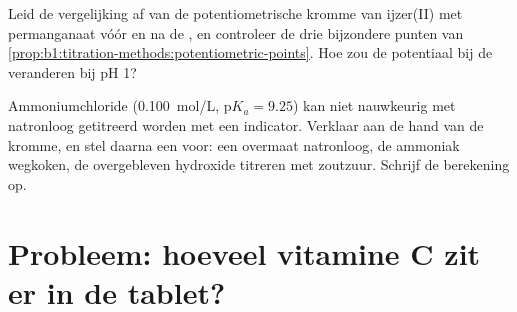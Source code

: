 \begin{exercise}[$\star\star\star$]\label{exo:b1:titration-methods:11}
Leid de vergelijking af van de potentiometrische kromme van ijzer(II)
met permanganaat vóór en na de , en controleer de drie
bijzondere punten van
\cref{prop:b1:titration-methods:potentiometric-points}. Hoe zou de
potentiaal bij de  veranderen bij pH 1?
\end{exercise}

\begin{exercise}[$\star\star\star$]\label{exo:b1:titration-methods:12}
Ammoniumchloride (\qty{0.100}{mol/L}, $\mathrm{p}K_a = 9.25$) kan niet
nauwkeurig met natronloog getitreerd worden met een indicator. Verklaar
aan de hand van de kromme, en stel daarna een  voor: een
overmaat natronloog, de ammoniak wegkoken, de overgebleven hydroxide
titreren met zoutzuur. Schrijf de berekening op.
\end{exercise}

\section{Probleem: hoeveel vitamine C zit er in de tablet?}

